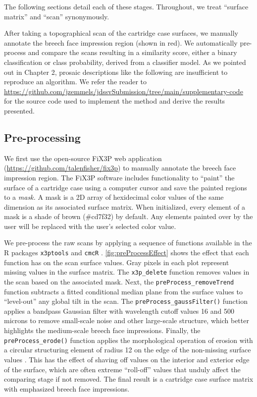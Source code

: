 \documentclass[preprint]{JASA}
\begin{document}
The following sections detail each of these stages. Throughout, we treat
``surface matrix'' and ``scan'' synonymously.

After taking a topographical scan of the cartridge case surfaces, we
manually annotate the breech face impression region (shown in red). We
automatically pre-process and compare the scans resulting in a
similarity score, either a binary classification or class probability,
derived from a classifier model. As we pointed out in Chapter 2, prosaic
descriptions like the following are insufficient to reproduce an
algorithm. We refer the reader to
\url{https://github.com/jzemmels/jdssvSubmission/tree/main/supplementary-code}
for the source code used to implement the method and derive the results
presented.

\hypertarget{pre-processing}{%
\subsection{Pre-processing}\label{pre-processing}}

We first use the open-source FiX3P web application
(\url{https://github.com/talenfisher/fix3p}) to manually annotate the
breech face impression region. The FiX3P software includes functionality
to ``paint'' the surface of a cartridge case using a computer cursor and
save the painted regions to a \emph{mask.} A mask is a 2D array of
hexidecimal color values of the same dimension as its associated surface
matrix. When initialized, every element of a mask is a shade of brown
(\#cd7f32) by default. Any elements painted over by the user will be
replaced with the user's selected color value.

We pre-process the raw scans by applying a sequence of functions
available in the R packages \texttt{x3ptools} \citep{x3ptools} and
\texttt{cmcR} \citep{cmcR}. \autoref{fig:preProcessEffect} shows the
effect that each function has on the scan surface values. Gray pixels in
each plot represent missing values in the surface matrix. The
\texttt{x3p\_delete} function removes values in the scan based on the
associated mask. Next, the \texttt{preProcess\_removeTrend} function
subtracts a fitted conditional median plane from the surface values to
``level-out'' any global tilt in the scan. The
\texttt{preProcess\_gaussFilter()} function applies a bandpass Gaussian
filter with wavelength cutoff values 16 and 500 microns to remove
small-scale noise and other large-scale structure, which better
highlights the medium-scale breech face impressions. Finally, the
\texttt{preProcess\_erode()} function applies the morphological
operation of erosion with a circular structuring element of radius 12 on
the edge of the non-missing surface values \citep{Haralick1987}. This
has the effect of shaving off values on the interior and exterior edge
of the surface, which are often extreme ``roll-off'' values that unduly
affect the comparing stage if not removed. The final result is a
cartridge case surface matrix with emphasized breech face impressions.
\end{document}
